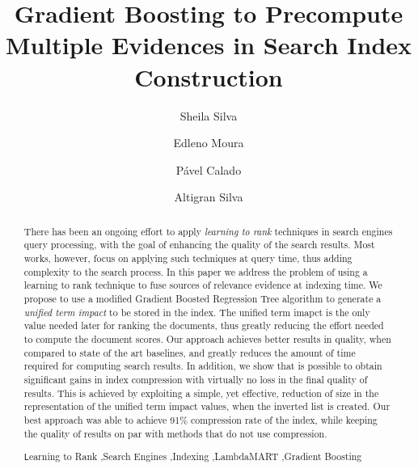 \documentclass[preprint,12pt,3p]{elsarticle}
\begin{document}
\begin{frontmatter}



\title{Gradient Boosting to Precompute Multiple Evidences in Search Index Construction}

\author[mymainaddress]{Sheila Silva}
\author[mymainaddress]{Edleno Moura}
\author[mysecondaryaddress]{P{\'a}vel Calado}
\author[mymainaddress]{Altigran Silva}

\address[mymainaddress]{Universidade Federal do Amazonas, Brasil}
\address[mysecondaryaddress]{INESC-ID, Instituto Superior Técnico, Universidade de Lisboa}


\begin{abstract}

There has been an ongoing effort to apply \textit{learning to rank} techniques in search engines query processing, with the goal of enhancing the quality of the search results. Most works, however, focus on applying such techniques at query time, thus adding complexity to the search process. In this paper we address the problem of using a learning to rank technique to fuse sources of relevance evidence at indexing time. We propose to use a modified Gradient Boosted Regression Tree algorithm to generate a \textit{unified term impact} to be stored in the index. The unified term imapct is the only value needed later for ranking the documents, thus greatly reducing the effort needed to compute the document scores. Our approach achieves better results in quality, when compared to state of the art baselines, and greatly reduces the amount of time required for computing search results. In addition, we show that is possible to obtain significant gains in index compression with virtually no loss in the final quality of results. This is achieved by exploiting a simple, yet effective, reduction of size in the representation of the unified term impact values, when the inverted list is created. Our best approach was able to achieve 91\% compression rate of the index, while keeping the quality of results on par with methods that do not use compression.


\begin{keyword}
\texttt Learning to Rank \sep Search Engines \sep Indexing \sep LambdaMART \sep Gradient Boosting
\end{keyword}

\end{abstract}
\end{frontmatter}
\end{document}
